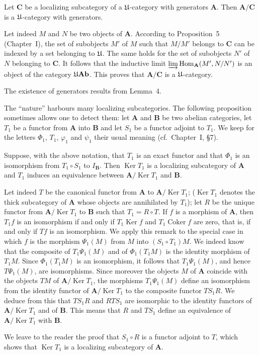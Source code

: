 \begin{lemma}
Let $\mathbf C$ be a localizing subcategory of a
$\mathfrak{U}$-category with generators $\mathbf A$. Then
$\mathbf A/\mathbf C$ is a $\mathfrak{U}$-category with generators.
\end{lemma}

Let indeed $M$ and $N$ be two objects of $\mathbf A$. According to
Proposition~5 (Chapter~I), the set of subobjects $M'$ of $M$ such that
$M/M'$ belongs to $\mathbf C$ can be indexed by a set belonging to
$\mathfrak{U}$. The same holds for the set of subobjects $N'$ of $N$ belonging
to $\mathbf C$. It follows that the inductive limit
$\varinjlim\operatorname{Hom}_{\mathbf A}(M',N/N')$ is an object of the
category $\mathfrak{U}\mathbf{Ab}$. This proves that $\mathbf A/\mathbf C$ is a
$\mathfrak{U}$-category.

The existence of generators results from Lemma~4.

The ``nature'' harbours many localizing subcategories. The following
proposition sometimes allows one to detect them: let $\mathbf A$ and
$\mathbf B$ be two abelian categories, let $T_1$ be a functor from
$\mathbf A$ into $\mathbf B$ and let $S_1$ be a functor adjoint to
$T_1$. We keep for the letters $\Phi_1$, $T_1$, $\varphi_1$ and
$\psi_1$ their usual meaning (cf.\ Chapter~I, \S7).

\begin{proposition}
Suppose, with the above notation, that $T_1$ is an exact functor and
that $\Phi_1$ is an isomorphism from $T_1\circ S_1$ to
$I_{\mathbf B}$. Then $\operatorname{Ker}T_1$ is a localizing
subcategory of $\mathbf A$ and $T_1$ induces an equivalence between
$\mathbf A/\operatorname{Ker}T_1$ and $\mathbf B$.
\end{proposition}

Let indeed $T$ be the canonical functor from $\mathbf A$ to
$\mathbf A/\operatorname{Ker}T_1$; ($\operatorname{Ker}T_1$ denotes the
thick subcategory of $\mathbf A$ whose objects are annihilated by
$T_1$); let $R$ be the unique functor from
$\mathbf A/\operatorname{Ker}T_1$ to $\mathbf B$ such that
$T_1=R\circ T$. If $f$ is a morphism of $\mathbf A$, then $T_1 f$ is an
isomorphism if and only if $T_1\operatorname{Ker}f$ and
$T_1\operatorname{Coker}f$ are zero, that is, if and only if $Tf$ is an
isomorphism. We apply this remark to the special case in which $f$ is the
morphism $\Psi_1(M)$ from $M$ into $(S_1\circ T_1)M$. We indeed know
that the composite of $T_1\Psi_1(M)$ and of $\Phi_1(T_1 M)$ is the
identity morphism of $T_1 M$. Since $\Phi_1(T_1 M)$ is an isomorphism,
it follows that $T_1\Psi_1(M)$, and hence $T\Psi_1(M)$, are
isomorphisms. Since moreover the objects $M$ of $\mathbf A$ coincide with
the objects $TM$ of $\mathbf A/\operatorname{Ker}T_1$, the morphisms
$T_1\Psi_1(M)$ define an isomorphism from the identity functor of
$\mathbf A/\operatorname{Ker}T_1$ to the composite functor $TS_1 R$. We
deduce from this that $TS_1 R$ and $R TS_1$ are isomorphic to the
identity functors of $\mathbf A/\operatorname{Ker}T_1$ and of
$\mathbf B$. This means that $R$ and $TS_1$ define an equivalence of
$\mathbf A/\operatorname{Ker}T_1$ with $\mathbf B$.

We leave to the reader the proof that $S_1\circ R$ is a functor adjoint
to $T$, which shows that $\operatorname{Ker}T_1$ is a localizing
subcategory of $\mathbf A$.
